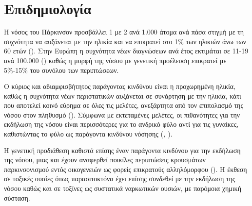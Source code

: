 \documentclass[12pt]{report}
\begin{document}
        \section{Επιδημιολογία}
        Η νόσος του Πάρκινσον προσβάλλει 1 με 2 ανά 1.000 άτομα ανά πάσα στιγμή με τη συχνότητα να αυξάνεται με την ηλικία και να επικρατεί στο 1\% των ηλικιών άνω των 60 ετών (\emph{\cite{Tysnes2017EpidemiologyDisease}}). Στην Ευρώπη η συχνότητα νέων διαγνώσεων ανά έτος εκτιμάται σε 11-19 ανά 100.000 (\emph{\cite{Balestrino2020ParkinsonDisease}}) καθώς η μορφή της νόσου με γενετική προέλευση επικρατεί με 5\%-15\% του συνόλου των περιπτώσεων.
        \par
        Ο κύριος και αδιαμφισβήτητος παράγοντας κινδύνου είναι η προχωρημένη ηλικία, καθώς η συχνότητα νέων περιστατικών αυξάνεται σε συνάρτηση με την ηλικία, κάτι που αποτελεί κοινό εύρημα σε όλες τις μελέτες, ανεξάρτητα από τον επιπολασμό της νόσου στον πληθυσμό (\emph{\cite{Tanner2005EPIDEMIOLOGYDISEASE}}). Σύμφωνα με εκτεταμένες μελέτες, οι πιθανότητες για την εκδήλωση της νόσου είναι περισσότερες για το ανδρικό φύλο αντί για τις γυναίκες, καθιστώντας το φύλο ως παράγοντα κινδύνου νόσησης (\emph{\cite{Baldereschi2000ParkinsonsMen}, \cite{VanDenEeden2003IncidenceRace/Ethnicity}}). 
        \par
        Η γενετική προδιάθεση καθιστά επίσης έναν παράγοντα κινδύνου για την εκδήλωση της νόσου, μιας και έχουν αναφερθεί ποικίλες περιπτώσεις κρουσμάτων παρκινσονισμού εντός οικογενειών ως φορείς επικρατούς αλληλόμορφου  (\emph{\cite{Tanner2005EPIDEMIOLOGYDISEASE}}). Η έκθεση σε τοξικές ουσίες όπως παρασιτοκτόνα έχει επίσης συνδεθεί με την εκδήλωση της νόσου καθώς και σε τοξίνες ως συστατικά ναρκωτικών ουσιών, με παρόμοια χημική σύσταση.
        
\end{document}
